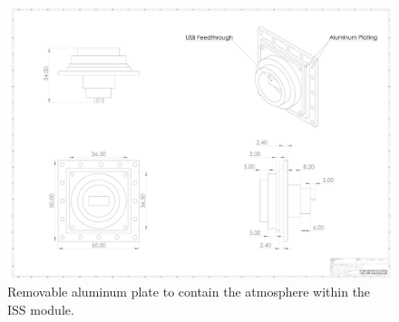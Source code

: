 \begin{centering}
\begin{figure}[h]
    \label{fig:iss-image}
  \end{figure}
  \begin{figure}[h]
    \caption{}
    \label{fig:}
  \end{figure}  
  \begin{figure}[h]
    \includegraphics[width=\textwidth]{Figures/inner-aluminum-plate-with-feedthrough.pdf}
    \caption{Removable aluminum plate to contain the atmosphere within the ISS module.}
    \label{fig:InnerAluminumPlate}
  \end{figure}
\end{centering}
